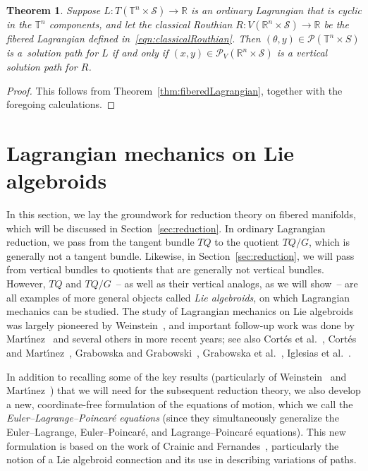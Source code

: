 \documentclass[10pt,a4paper]{amsart}
\numberwithin{equation}{section}
\newtheorem{Theorem}{Theorem}[section]
\begin{document}
\begin{Theorem} Suppose $ L \colon T ( \mathbb{T} ^n \times \mathcal{S} ) \rightarrow \mathbb{R} $ is an ordinary Lagrangian that is cyclic in the $ \mathbb{T} ^n $ components, and let the classical Routhian $ R \colon V ( \mathbb{R}^n \times \mathcal{S} ) \rightarrow \mathbb{R} $ be the fibered Lagrangian defined in~\eqref{eqn:classicalRouthian}. Then $ ( \theta , y ) \in \mathcal{P} ( \mathbb{T} ^n \times S ) $ is a~solution path for $L$ if and only if $ ( x, y ) \in \mathcal{P} _V ( \mathbb{R} ^n \times \mathcal{S} ) $ is a vertical solution path for $R$.
\end{Theorem}

\begin{proof}
This follows from Theorem~\ref{thm:fiberedLagrangian}, together with the foregoing calculations.
\end{proof}

\section{Lagrangian mechanics on Lie algebroids}\label{sec:algebroids}

In this section, we lay the groundwork for reduction theory on f\/ibered manifolds, which will be discussed in Section~\ref{sec:reduction}. In ordinary Lagrangian reduction, we pass from the tangent bundle $ T Q $ to the quotient $ T Q / G $, which is generally not a tangent bundle. Likewise, in Section~\ref{sec:reduction}, we will pass from vertical bundles to quotients that are generally not vertical bundles. However, $ T Q $ and $ T Q / G $~-- as well as their vertical analogs, as we will show~-- are all examples of more general objects called \emph{Lie algebroids}, on which Lagrangian mechanics can be studied. The study of Lagrangian mechanics on Lie algebroids was largely pioneered by Weinstein~\cite{Weinstein1996}, and important follow-up work was done by Mart\'{\i}nez~\cite{Martinez2001,Martinez2007,Martinez2008} and several others in more recent years; see also Cort\'es et al.~\cite{CoLeMaMaMa2006}, Cort\'es and Mart\'{\i}nez~\cite{CoMa2004}, Grabowska and Grabowski~\cite{GrGr2008}, Grabowska et al.~\cite{GrUrGr2006}, Iglesias et al.~\cite{IgMaMaMa2008, IgMaMaSo2008}.

In addition to recalling some of the key results (particularly of Weinstein~\cite{Weinstein1996} and Mart\'{\i}nez~\cite{Martinez2001}) that we will need for the subsequent reduction theory, we also develop a new, coordinate-free formulation of the equations of motion, which we call the \emph{Euler--Lagrange--Poincar\'e equations} (since they simultaneously generalize the Euler--Lagrange, Euler--Poincar\'e, and Lagrange--Poincar\'e equations). This new formulation is based on the work of Crainic and Fernandes~\cite{CrFe2003}, particularly the notion of a Lie algebroid connection and its use in describing variations of paths.
\end{document}
